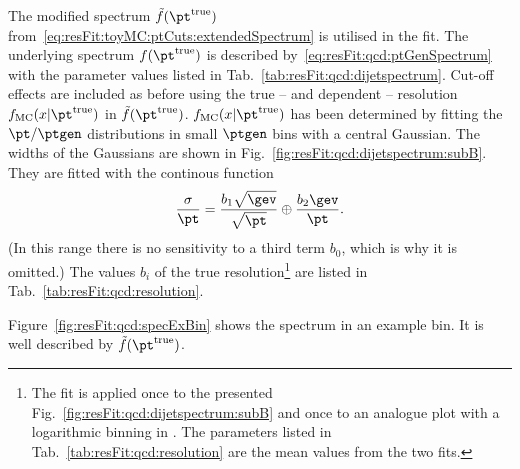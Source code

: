 \documentclass[a4paper]{cmspaper} %
\newcommand{\truth}{\ensuremath{\pt^{\text{true}}}\xspace}
\begin{document}
The modified spectrum $\tilde{f}(\truth)$ from~\eqref{eq:resFit:toyMC:ptCuts:extendedSpectrum} is utilised in the fit.
The underlying spectrum $f(\truth)$ is described by~\eqref{eq:resFit:qcd:ptGenSpectrum} with the parameter values listed in Tab.~\ref{tab:resFit:qcd:dijetspectrum}.
Cut-off effects are included as before using the true -- and \pt dependent -- resolution $f_{\text{MC}}(x|\truth)$ in $\tilde{f}(\truth)$.
$f_{\text{MC}}(x|\truth)$ has been determined by fitting the $\pt/\ptgen$ distributions in small $\ptgen$ bins with a central Gaussian.
The widths of the Gaussians are shown in Fig.~\ref{fig:resFit:qcd:dijetspectrum:subB}.
They are fitted with the continous function
\begin{equation}
  \label{eq:resFit:qcd:sigma}
  \frac{\sigma}{\pt} = \frac{b_{1}\sqrt{\gev}}{\sqrt{\pt}} \oplus \frac{b_{2}\gev}{\pt}.
\end{equation}
(In this \pt range there is no sensitivity to a third term $b_{0}$, which is why it is omitted.)
The values $b_{i}$ of the true resolution\footnote{The fit is applied once to the presented Fig.~\ref{fig:resFit:qcd:dijetspectrum:subB} and once to an analogue plot with a logarithmic binning in \ptgen.
The parameters listed in Tab.~\ref{tab:resFit:qcd:resolution} are the mean values from the two fits.}
are listed in Tab.~\ref{tab:resFit:qcd:resolution}.

Figure~\ref{fig:resFit:qcd:specExBin} shows the \ptgen spectrum in an example bin.
It is well described by $\tilde{f}(\truth)$.
\end{document}

